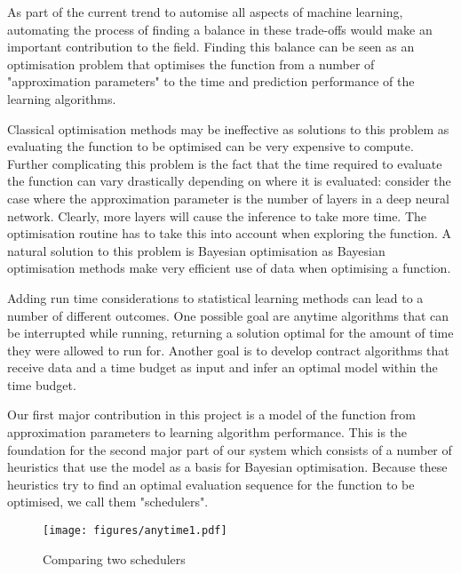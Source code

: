\documentclass[a4paper,12pt,twoside,openright]{report}
\begin{document}
As part of the current trend to automise all aspects of machine learning, automating the process of finding a balance in these trade-offs would make an important contribution to the field. Finding this balance can be seen as an optimisation problem that optimises the function from a number of "approximation parameters" to the time and prediction performance of the learning algorithms. 

Classical optimisation methods may be ineffective as solutions to this problem as evaluating the function to be optimised can be very expensive to compute. Further complicating this problem is the fact that the time required to evaluate the function can vary drastically depending on where it is evaluated: consider the case where the approximation parameter is the number of layers in a deep neural network. Clearly, more layers will cause the inference to take more time. The optimisation routine has to take this into account when exploring the function. A natural solution to this problem is Bayesian optimisation as Bayesian optimisation methods make very efficient use of data when optimising a function.

Adding run time considerations to statistical learning methods can lead to a number of different outcomes. One possible goal are anytime algorithms that can be interrupted while running, returning a solution optimal for the amount of time they were allowed to run for. Another goal is to develop contract algorithms that receive data and a time budget as input and infer an optimal model within the time budget.


Our first major contribution in this project is a model of the function from approximation parameters to learning algorithm performance. This is the foundation for the second major part of our system which consists of a number of heuristics that use the model as a basis for Bayesian optimisation. Because these heuristics try to find an optimal evaluation sequence for the function to be optimised, we call them "schedulers".

\begin{figure}
\centering
  \texttt{[image: figures/anytime1.pdf]}
  \caption{Comparing two schedulers}
  \label{anytime1}
\end{figure}
\end{document}
